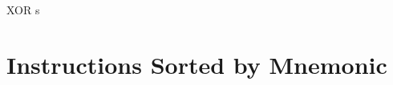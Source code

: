 \documentclass[12pt,twoside,openright,a4paper]{book}
\begin{document}
\begin{basedescript}{
	\desclabelstyle{\multilinelabel}
	\desclabelwidth{3cm}}
\begin{DetailItem}{XOR s}
		\begin{DetailEffects}[p]
			\FlagsXORr
		\end{DetailEffects}
						
		\begin{DetailTiming}
		\end{DetailTiming}

	\end{DetailItem}

\end{basedescript}


\pagebreak
\IntentionallyEmpty
\pagebreak


\appendix



\chapter{Instructions Sorted by Mnemonic}

\end{document}
